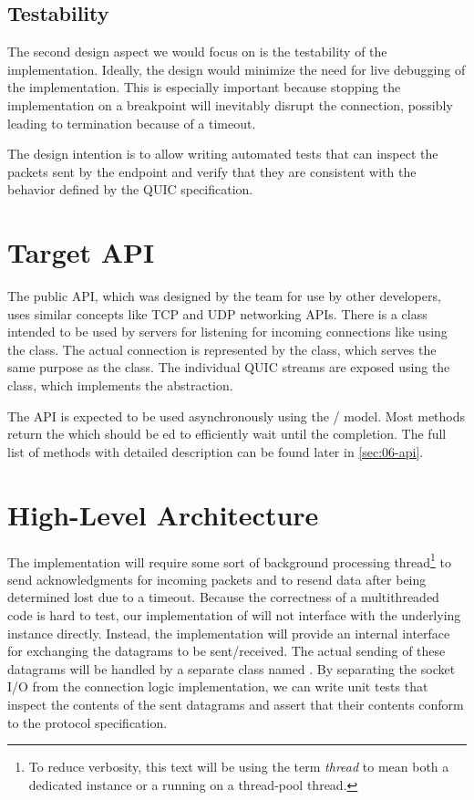 \subsection{Testability}

The second design aspect we would focus on is the testability of the implementation. Ideally, the
design would minimize the need for live debugging of the implementation. This is especially
important because stopping the implementation on a breakpoint will inevitably disrupt the
connection, possibly leading to termination because of a timeout.

The design intention is to allow writing automated tests that can inspect the packets sent by the
endpoint and verify that they are consistent with the behavior defined by the QUIC specification.

\section{Target \dotnet{} API}

The public API, which was designed by the \dotnet{} team for use by other developers, uses similar
concepts like TCP and UDP \dotnet{} networking APIs. There is a \QuicListener{} class intended to be
used by servers for listening for incoming connections like using the  class. The
actual connection is represented by the \QuicConnection{} class, which serves the same purpose as
the  class. The individual QUIC streams are exposed using the \QuicStream{} class,
which implements the  abstraction.

The API is expected to be used asynchronously using the / model. Most
methods return the  which should be ed to efficiently wait until the
completion. The full list of methods with detailed description can be found later in
\autoref{sec:06-api}.

\section{High-Level Architecture}\label{sec:03-high-level-architecture}

The \QuicConnection{} implementation will require some sort of background processing
thread\footnote{To reduce verbosity, this text will be using the term \textit{thread} to mean both a
dedicated  instance or a  running on a thread-pool thread.} to send
acknowledgments for incoming packets and to resend data after being determined lost due to a
timeout. Because the correctness of a multithreaded code is hard to test, our implementation of
\QuicConnection{} will not interface with the underlying \Socket{} instance directly. Instead, the
implementation will provide an internal interface for exchanging the datagrams to be sent/received.
The actual sending of these datagrams will be handled by a separate class named
\QuicSocketContext{}. By separating the socket I/O from the connection logic implementation, we can
write unit tests that inspect the contents of the sent datagrams and assert that their contents
conform to the protocol specification.

